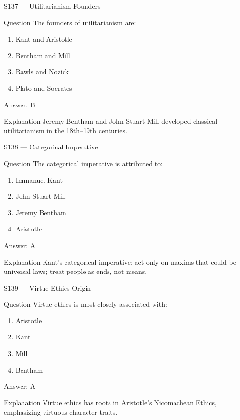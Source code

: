 \documentclass[aspectratio=169,8pt]{beamer}
\begin{document}
	\begin{frame}{S137 --- Utilitarianism Founders}
		\begin{block}{Question}
			The founders of utilitarianism are:
			\begin{enumerate}
				\item Kant and Aristotle
				\item Bentham and Mill
				\item Rawls and Nozick
				\item Plato and Socrates
			\end{enumerate}
		\end{block}
		\begin{exampleblock}{Answer: B}\end{exampleblock}
		\begin{block}{Explanation}
			Jeremy Bentham and John Stuart Mill developed classical utilitarianism in the 18th–19th centuries.
		\end{block}
	\end{frame}
	
	\begin{frame}{S138 --- Categorical Imperative}
		\begin{block}{Question}
			The categorical imperative is attributed to:
			\begin{enumerate}
				\item Immanuel Kant
				\item John Stuart Mill
				\item Jeremy Bentham
				\item Aristotle
			\end{enumerate}
		\end{block}
		\begin{exampleblock}{Answer: A}\end{exampleblock}
		\begin{block}{Explanation}
			Kant's categorical imperative: act only on maxims that could be universal laws; treat people as ends, not means.
		\end{block}
	\end{frame}
	
	\begin{frame}{S139 --- Virtue Ethics Origin}
		\begin{block}{Question}
			Virtue ethics is most closely associated with:
			\begin{enumerate}
				\item Aristotle
				\item Kant
				\item Mill
				\item Bentham
			\end{enumerate}
		\end{block}
		\begin{exampleblock}{Answer: A}\end{exampleblock}
		\begin{block}{Explanation}
			Virtue ethics has roots in Aristotle's Nicomachean Ethics, emphasizing virtuous character traits.
		\end{block}
	\end{frame}
	
\end{document}
